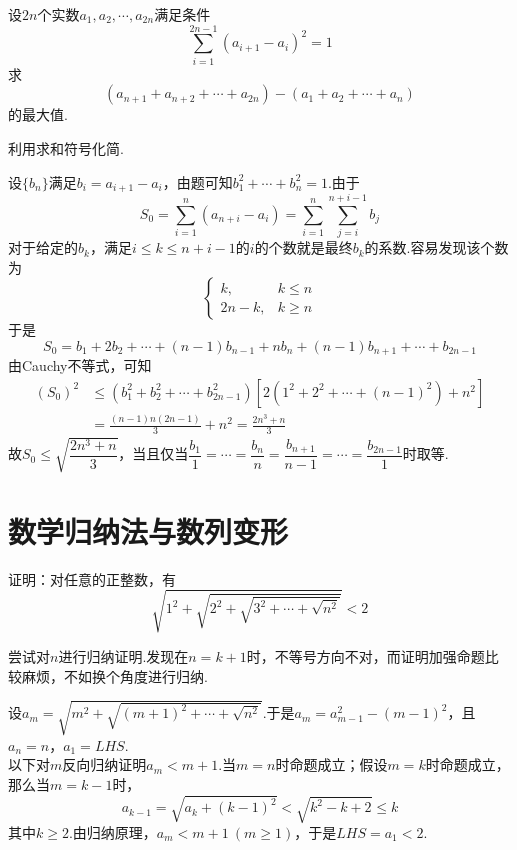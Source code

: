 \documentclass[lang=cn, zihao=4.5]{elegantbook}
\begin{document}
\begin{example} %
	设$2n$个实数$a_1,a_2, \cdots ,a_{2n}$满足条件$$\sum_{i=1}^{2n-1} (a_{i+1}-a_i)^2 = 1$$
	求$$(a_{n+1} + a_{n+2} + \cdots + a_{2n}) - (a_{1} + a_{2} + \cdots + a_{n})$$的最大值.
\end{example}
\begin{hint}
	利用求和符号化简.
\end{hint}
\begin{solution}
	设$\{ b_n \}$满足$b_i = a_{i+1} - a_i$，由题可知$b_1^2 + \cdots + b_n^2 = 1$.由于$$S_0 = \sum_{i=1}^{n} (a_{n+i} - a_i) = \sum_{i=1}^{n} \sum_{j=i}^{n+i-1} b_j$$
	对于给定的$b_k$，满足$i \leq k \leq n+i-1$的$i$的个数就是最终$b_k$的系数.容易发现该个数为$$
	\begin{cases}
		k, \quad &k \leq n \\
		2n-k, & k \geq n
	\end{cases}$$
	于是$$S_0 = b_1+2b_2 + \cdots + (n-1)b_{n-1} + nb_n + (n-1)b_{n+1} + \cdots + b_{2n-1}$$
	由Cauchy不等式，可知
	\begin{align*}
		(S_0)^2 &\leq (b_1^2+b_2^2 + \cdots + b_{2n-1}^2)[2(1^2+2^2 + \cdots + (n-1)^2)+n^2] \\
		&= \frac{(n-1)n(2n-1)}{3} + n^2 = \frac{2n^3+n}{3}
	\end{align*}
	故$S_0 \leq \sqrt{\dfrac{2n^3+n}{3}}$，当且仅当$\dfrac{b_1}{1} = \cdots = \dfrac{b_n}{n} = \dfrac{b_{n+1}}{n-1} = \cdots = \dfrac{b_{2n-1}}{1}$时取等.
\end{solution}



\section{数学归纳法与数列变形}

\begin{example} %
	证明：对任意的正整数，有$$\sqrt{1^2+ \sqrt{2^2+ \sqrt{3^2+ \cdots + \sqrt{n^2}}}}<2$$
\end{example}
\begin{hint}
	尝试对$n$进行归纳证明.发现在$n=k+1$时，不等号方向不对，而证明加强命题比较麻烦，不如换个角度进行归纳.
\end{hint}
\begin{solution}
	设$a_m = \sqrt{m^2+\sqrt{(m+1)^2 + \cdots + \sqrt{n^2}}}$.于是$a_m=a_{m-1}^2-(m-1)^2$，且$a_n=n$，$a_1=LHS$. \\
	以下对$m$反向归纳证明$a_m<m+1$.当$m=n$时命题成立；假设$m=k$时命题成立，那么当$m=k-1$时，$$a_{k-1} = \sqrt{a_k + (k-1)^2} < \sqrt{k^2-k+2} \leq k$$
	其中$k \geq 2$.由归纳原理，$a_m<m+1~(m \geq 1)$，于是$LHS=a_1 <2$.
\end{solution}
\end{document}
